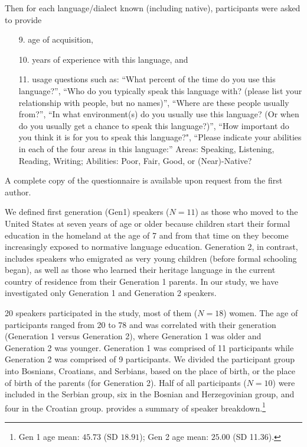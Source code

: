 \documentclass[output=paper,modfonts,newtxmath,hidelinks,]{langscibook}
\begin{document}
Then for each language/dialect known (including native), participants were asked to provide 

\begin{enumerate}
\item[9.] age of acquisition, 
\item[10.] years of experience with this language, and 
\item[11.] usage questions such as:          
  “What percent of the time do you use this language?”,    
  “Who do you typically speak this language with? (please list your     relationship with people, but no names)”, “Where are these people usually from?”,
  “In what environment(s) do you usually use this language? (Or when do     you usually get a chance to speak this language?)”,
  “How important do you think it is for you to speak this language?", 
  “Please indicate your abilities in each of the four areas in this language:” Areas: Speaking, Listening, Reading, Writing; Abilities: Poor, Fair, Good, or (Near)-Native?
\end{enumerate}

A complete copy of the questionnaire is available upon request from the first author.

We defined first generation (Gen1) speakers ($N=11$) as those who moved to the United States at seven years of age or older because children start their formal education in the homeland at the age of 7 and from that time on they become increasingly exposed to normative language education. Generation 2, in contrast, includes speakers who emigrated as very young children (before formal schooling began), as well as those who learned their heritage language in the current country of residence from their Generation 1 parents. In our study, we have investigated only Generation 1 and Generation 2 speakers.



20 speakers participated in the study, most of them ($N=18$) women. The age of participants ranged from 20 to 78 and was correlated with their generation (Generation 1 versus Generation 2), where Generation 1 was older and Generation 2 was younger. Generation 1 was comprised of 11 participants while Generation 2 was comprised of 9 participants. We divided the participant group into Bosnians, Croatians, and Serbians, based on the place of birth, or the place of birth of the parents (for Generation 2). Half of all participants ($N=10$) were included in the Serbian group, six in the Bosnian and Herzegovinian group, and four in the Croatian group.  provides a summary of speaker breakdown.\footnote{Gen 1 age mean: $45.73$ (SD $18.91$); Gen 2 age mean: $25.00$ (SD 11.36).}
\end{document}
